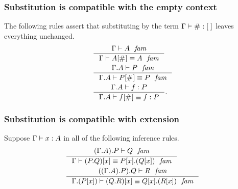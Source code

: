 \subsubsection{Substitution is compatible with the empty context}

The following rules assert that substituting by the term $\jterm{\Gamma}{\emptyf}{\emptytm}$
leaves everything unchanged.
\begin{align}
& \inference{\jfam{\Gamma}{A}}{\jfameq{\Gamma}{\subst{\emptytm}{A}}{A}}\\
& \inference{\jfam{\ctxext{\Gamma}{A}}{P}}{\jfameq{\ctxext{\Gamma}{A}}{\subst{\emptytm}{P}}{P}}\\
& \inference{\jterm{\ctxext{\Gamma}{A}}{P}{f}}{\jtermeq{\ctxext{\Gamma}{A}}{P}{\subst{\emptytm}{f}}{f}}.
\end{align}

\subsubsection{Substitution is compatible with extension}\label{comp-se}
Suppose $\jterm{\Gamma}{A}{x}$ in all of the following inference rules.
\begin{align}
& \inference{\jfam{\ctxext{{\Gamma}{A}}{P}}{Q}}
  {\jfameq{\Gamma}{\subst{x}{\ctxext{P}{Q}}}{\ctxext{\subst{x}{P}}{\subst{x}{Q}}}}\\
& \inference{\jfam{\ctxext{{{\Gamma}{A}}{P}}{Q}}{R}}
  {\jfameq{\ctxext{\Gamma}{\subst{x}{P}}}{\subst{x}{\ctxext{Q}{R}}}{\ctxext{\subst{x}{Q}}{\subst{x}{R}}}}
\end{align}

